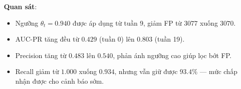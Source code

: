 \documentclass[12pt,a4paper]{article}
\begin{document}
\textbf{Quan sát}:
\begin{itemize}
    \item Ngưỡng $\theta_t = 0.940$ được áp dụng từ tuần 9, giảm FP từ $3077$ xuống $3070$.
    \item AUC-PR tăng đều từ $0.429$ (tuần 0) lên $0.803$ (tuần 19).
    \item Precision tăng từ $0.483$ lên $0.540$, phản ánh ngưỡng cao giúp lọc bớt FP.
    \item Recall giảm từ $1.000$ xuống $0.934$, nhưng vẫn giữ được $93.4\%$ --- mức chấp nhận được cho cảnh báo sớm.
\end{itemize}
\end{document}
